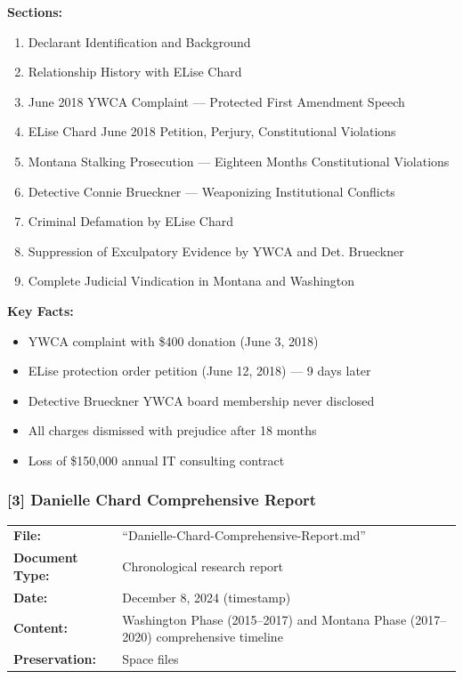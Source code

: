 \documentclass[11pt,letterpaper]{article}
\newcommand{\citeref}[1]{\textbf{\color{NavyBlue}[#1]}}
\begin{document}
\vspace{0.1in}

\textbf{Sections:}
\begin{enumerate}[leftmargin=*]
\item Declarant Identification and Background
\item Relationship History with ELise Chard
\item June 2018 YWCA Complaint --- Protected First Amendment Speech
\item ELise Chard June 2018 Petition, Perjury, Constitutional Violations
\item Montana Stalking Prosecution --- Eighteen Months Constitutional Violations
\item[VII.] Detective Connie Brueckner --- Weaponizing Institutional Conflicts
\item[VIII.] Criminal Defamation by ELise Chard
\item[IX.] Suppression of Exculpatory Evidence by YWCA and Det. Brueckner
\item[X.] Complete Judicial Vindication in Montana and Washington
\end{enumerate}

\textbf{Key Facts:}
\begin{itemize}[leftmargin=*]
\item YWCA complaint with \$400 donation (June 3, 2018)
\item ELise protection order petition (June 12, 2018) --- 9 days later
\item Detective Brueckner YWCA board membership never disclosed
\item All charges dismissed with prejudice after 18 months
\item Loss of \$150,000 annual IT consulting contract
\end{itemize}

\subsubsection{\citeref{3} Danielle Chard Comprehensive Report}

\begin{tabular}{@{}p{1.4in}p{4.6in}@{}}
\textbf{File:} & ``Danielle-Chard-Comprehensive-Report.md''\\
\textbf{Document Type:} & Chronological research report\\
\textbf{Date:} & December 8, 2024 (timestamp)\\
\textbf{Content:} & Washington Phase (2015--2017) and Montana Phase (2017--2020) comprehensive timeline\\
\textbf{Preservation:} & Space files\\
\end{tabular}
\end{document}
